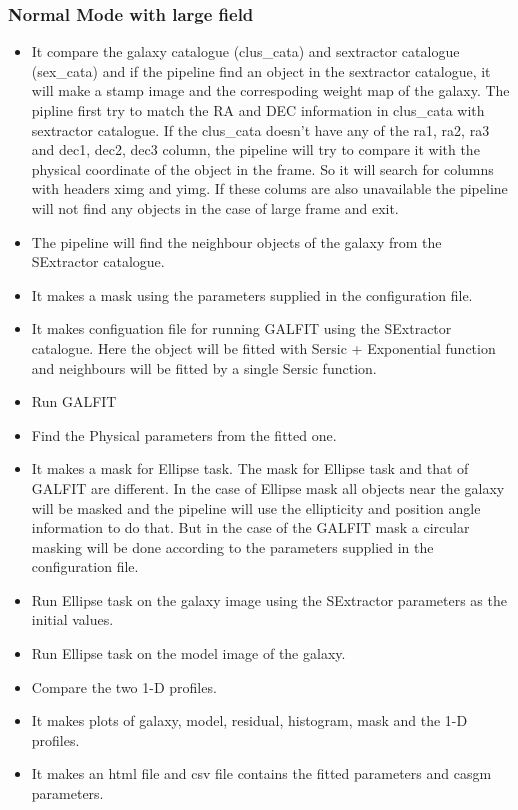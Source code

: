 \documentclass[a4paper,12pt]{article}
\begin{document}
\subsubsection{Normal Mode with large field}
\begin{itemize}
\item It compare the galaxy catalogue (clus\_cata) and sextractor catalogue (sex\_cata) and if the pipeline find an object in the sextractor catalogue, it will make a stamp image and the correspoding weight map of the galaxy. The pipline first try to match the RA and DEC information in clus\_cata with sextractor catalogue. If the clus\_cata doesn't have any of the ra1, ra2, ra3 and dec1, dec2, dec3 column, the pipeline will try to compare it with
 the physical coordinate of the object in the frame. So it will search for columns with headers ximg and yimg. If these colums are also unavailable the pipeline will not find any objects in the case of large frame and exit.
\item The pipeline will find the neighbour objects of the galaxy from the SExtractor catalogue.
\item It makes a mask using the parameters supplied in the configuration file.
\item It makes configuation file for running GALFIT using the SExtractor catalogue. Here the object will be fitted with Sersic + Exponential function and neighbours will be fitted by a single Sersic function.
\item Run GALFIT
\item Find the Physical parameters from the fitted one.
\item It makes a mask for Ellipse task. The mask for Ellipse task and that of GALFIT are different. In the case of Ellipse mask all objects near the galaxy will be masked and the pipeline will use the ellipticity and position angle information to do that. But in the case of the GALFIT mask a circular masking will be done according to the parameters
 supplied in the configuration file.
\item Run Ellipse task on the galaxy image using the SExtractor parameters as the initial values.
\item Run Ellipse task on the model image of the galaxy.
\item Compare the two 1-D profiles.
\item It makes plots of galaxy, model, residual, histogram, mask and the 1-D profiles.
\item It makes an html file and csv file contains the fitted parameters and casgm parameters.
\end{itemize}
\end{document}
